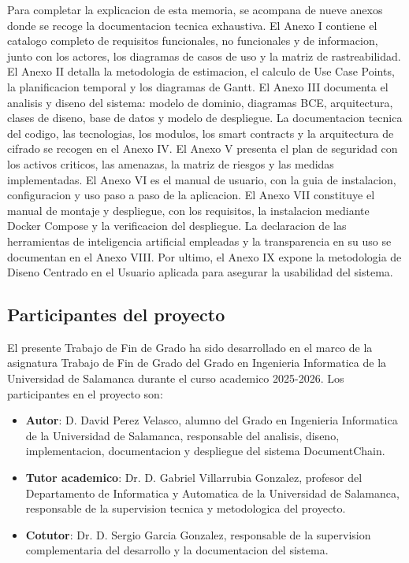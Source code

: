 \documentclass[11pt, a4paper]{article}
\begin{document}
\noindent Para completar la explicacion de esta memoria, se acompana de nueve anexos donde se recoge la documentacion tecnica exhaustiva. El Anexo I contiene el catalogo completo de requisitos funcionales, no funcionales y de informacion, junto con los actores, los diagramas de casos de uso y la matriz de rastreabilidad. El Anexo II detalla la metodologia de estimacion, el calculo de Use Case Points, la planificacion temporal y los diagramas de Gantt. El Anexo III documenta el analisis y diseno del sistema: modelo de dominio, diagramas BCE, arquitectura, clases de diseno, base de datos y modelo de despliegue. La documentacion tecnica del codigo, las tecnologias, los modulos, los smart contracts y la arquitectura de cifrado se recogen en el Anexo IV. El Anexo V presenta el plan de seguridad con los activos criticos, las amenazas, la matriz de riesgos y las medidas implementadas. El Anexo VI es el manual de usuario, con la guia de instalacion, configuracion y uso paso a paso de la aplicacion. El Anexo VII constituye el manual de montaje y despliegue, con los requisitos, la instalacion mediante Docker Compose y la verificacion del despliegue. La declaracion de las herramientas de inteligencia artificial empleadas y la transparencia en su uso se documentan en el Anexo VIII. Por ultimo, el Anexo IX expone la metodologia de Diseno Centrado en el Usuario aplicada para asegurar la usabilidad del sistema.

\subsection{Participantes del proyecto}

El presente Trabajo de Fin de Grado ha sido desarrollado en el marco de la asignatura Trabajo de Fin de Grado del Grado en Ingenieria Informatica de la Universidad de Salamanca durante el curso academico 2025-2026. Los participantes en el proyecto son:

\begin{itemize}
    \item \textbf{Autor}: D. David Perez Velasco, alumno del Grado en Ingenieria Informatica de la Universidad de Salamanca, responsable del analisis, diseno, implementacion, documentacion y despliegue del sistema DocumentChain.
    \item \textbf{Tutor academico}: Dr. D. Gabriel Villarrubia Gonzalez, profesor del Departamento de Informatica y Automatica de la Universidad de Salamanca, responsable de la supervision tecnica y metodologica del proyecto.
    \item \textbf{Cotutor}: Dr. D. Sergio Garcia Gonzalez, responsable de la supervision complementaria del desarrollo y la documentacion del sistema.
\end{itemize}
\end{document}
